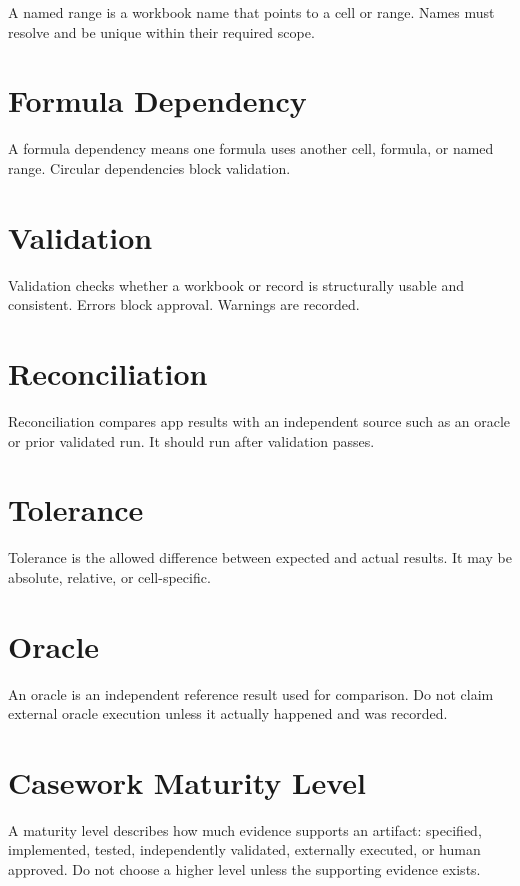 A named range is a workbook name that points to a cell or range. Names must resolve and be unique within their required scope.

\section{Formula Dependency}

A formula dependency means one formula uses another cell, formula, or named range. Circular dependencies block validation.

\section{Validation}

Validation checks whether a workbook or record is structurally usable and consistent. Errors block approval. Warnings are recorded.

\section{Reconciliation}

Reconciliation compares app results with an independent source such as an oracle or prior validated run. It should run after validation passes.

\section{Tolerance}

Tolerance is the allowed difference between expected and actual results. It may be absolute, relative, or cell-specific.

\section{Oracle}

An oracle is an independent reference result used for comparison. Do not claim external oracle execution unless it actually happened and was recorded.

\section{Casework Maturity Level}

A maturity level describes how much evidence supports an artifact: specified, implemented, tested, independently validated, externally executed, or human approved. Do not choose a higher level unless the supporting evidence exists.

